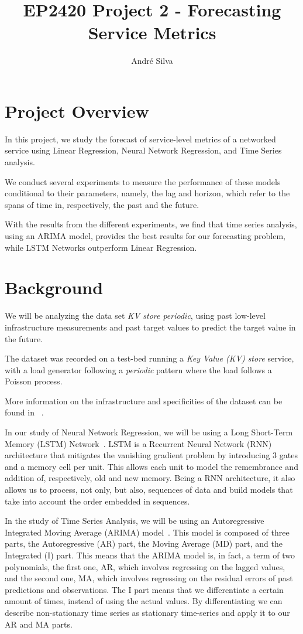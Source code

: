\documentclass[10pt]{article}
\title{EP2420 Project 2 - Forecasting Service Metrics}
\author{André Silva}
\begin{document}
\maketitle

\section*{Project Overview}
\label{sec:1}

In this project, we study the forecast of service-level metrics of a networked service using Linear Regression, Neural Network Regression, and Time Series analysis.

We conduct several experiments to measure the performance of these models conditional to their parameters, namely, the lag and horizon, which refer to the spans of time in, respectively, the past and the future.

With the results from the different experiments, we find that time series analysis, using an ARIMA model, provides the best results for our forecasting problem, while LSTM Networks outperform Linear Regression.

\section*{Background}
\label{sec:2}

We will be analyzing the data set \textit{KV store periodic}, using past low-level infrastructure measurements and past target values to predict the target value in the future.

The dataset was recorded on a test-bed running a \textit{Key Value (KV) store} service, with a load generator following a \textit{periodic} pattern where the load follows a Poisson process.

More information on the infrastructure and specificities of the dataset can be found in ~\cite{9012741}.

In our study of Neural Network Regression, we will be using a Long Short-Term Memory (LSTM) Network~\cite{LSTM}.
LSTM is a Recurrent Neural Network (RNN)~\cite{RNN} architecture that mitigates the vanishing gradient problem by introducing $3$ gates and a memory cell per unit. This allows each unit to model the remembrance and addition of, respectively, old and new memory. Being a RNN architecture, it also allows us to process, not only, but also, sequences of data and build models that take into account the order embedded in sequences.

In the study of Time Series Analysis, we will be using an Autoregressive Integrated Moving Average (ARIMA) model~\cite{ARIMA}. This model is composed of three parts, the Autoregressive (AR) part, the Moving Average (MD) part, and the Integrated (I) part. This means that the ARIMA model is, in fact, a term of two polynomials, the first one, AR, which involves regressing on the lagged values, and the second one, MA, which involves regressing on the residual errors of past predictions and observations. The I part means that we differentiate a certain amount of times, instead of using the actual values. By differentiating we can describe non-stationary time series as stationary time-series and apply it to our AR and MA parts.
\end{document}
